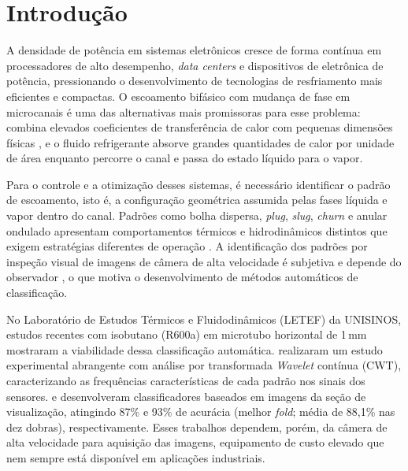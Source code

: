 \chapter{Introdução}\label{cap:introducao}

A densidade de potência em sistemas eletrônicos cresce de forma contínua em processadores
de alto desempenho, \textit{data centers} e dispositivos de eletrônica de potência, pressionando o
desenvolvimento de tecnologias de resfriamento mais eficientes e compactas. O escoamento
bifásico com mudança de fase em microcanais é uma das alternativas mais promissoras para
esse problema: combina elevados coeficientes de transferência de calor com pequenas
dimensões físicas \cite{cheng2023}, e o fluido refrigerante absorve grandes quantidades de
calor por unidade de área enquanto percorre o canal e passa do estado líquido para o vapor.

Para o controle e a otimização desses sistemas, é necessário identificar o padrão de
escoamento, isto é, a configuração geométrica assumida pelas fases líquida e vapor dentro
do canal. Padrões como bolha dispersa, \textit{plug}, \textit{slug}, \textit{churn} e
anular ondulado apresentam comportamentos térmicos e hidrodinâmicos distintos que exigem
estratégias diferentes de operação \cite{cheng2023,deoliveira2021}. A identificação dos padrões por
inspeção visual de imagens de câmera de alta velocidade é subjetiva e depende
do observador \cite{dias2025knn}, o que motiva o desenvolvimento de métodos
automáticos de classificação.

No Laboratório de Estudos Térmicos e Fluidodinâmicos (LETEF) da UNISINOS, estudos
recentes com isobutano (R600a) em microtubo horizontal de 1\,mm mostraram a viabilidade
dessa classificação automática.  realizaram um estudo
experimental abrangente com análise por transformada \textit{Wavelet} contínua (CWT),
caracterizando as frequências características de cada padrão nos sinais dos sensores.
 e  desenvolveram classificadores baseados
em imagens da seção de visualização, atingindo 87\% e 93\% de acurácia (melhor \textit{fold};
média de 88{,}1\% nas dez dobras), respectivamente.
Esses trabalhos dependem, porém, da câmera de alta velocidade para aquisição das imagens,
equipamento de custo elevado que nem sempre está disponível em aplicações industriais.

